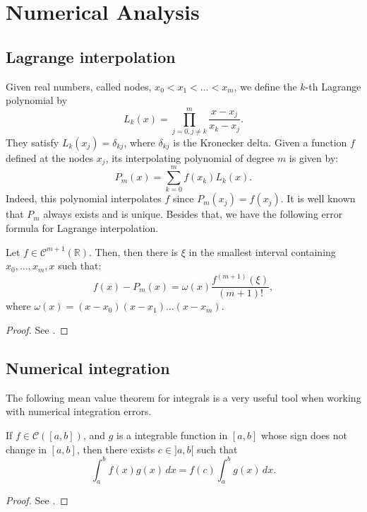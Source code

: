 \chapter{Numerical Analysis}
\label{anexo-na}

\section{Lagrange interpolation}
\label{anexo-interp}
Given real numbers, called nodes, $x_0< x_1 < \ldots< x_m$, we define the $k$-th Lagrange polynomial by
\begin{equation*}
	L_k(x) = \prod_{j=0, j \neq k}^{m}\frac{x-x_j}{x_k-x_j}.
\end{equation*}
They satisfy $L_k(x_j) = \delta_{kj}$, where  $\delta_{kj}$ is the Kronecker delta.
Given a function $f$ defined at the nodes $x_j$, its interpolating polynomial of 
degree $m$ is given by:
\begin{equation*}
	P_m(x) = \sum_{k=0}^{m} f(x_k)L_k(x).
\end{equation*}
Indeed, this polynomial interpolates $f$ since $P_m(x_j) = f(x_j)$.
It is well known that $P_m$ always exists and is unique. Besides that, we have the following error formula
for Lagrange interpolation.
\begin{thrm}
	\label{anexo-interp-error1}
	Let $f \in \mathcal{C}^{m+1}(\mathbb{R})$.
	Then, then there is $\xi$ in the smallest interval containing $x_0, \ldots, x_m, x$ such that:
	\begin{equation}
		f(x)-P_m(x) = \omega(x)\frac{f^{(m+1)}(\xi)}{(m+1)!},
	\end{equation}
	where $\omega(x) = (x-x_0)(x-x_1) \ldots (x-x_m)$.
\end{thrm}
\begin{proof}
	See \citet[Theorem~2.1.4.1. on \pno~49]{stoer:2002}.
\end{proof}

\section{Numerical integration}
\label{anexo-numint}

The following mean value theorem for integrals is a very useful tool 
when working with numerical integration errors.
\begin{thrm}
	\label{anexo-numint-mv}
	If $f \in \mathcal{C}([a,b])$, and $g$ is a integrable function in $[a,b]$
	whose sign does not change in $[a,b]$,
	then there exists $c \in ]a,b[$ such that
	\begin{equation*}
		\int_{a}^{b}f(x)g(x) \,dx = f(c)\int_{a}^{b}g(x) \,dx.
	\end{equation*}
\end{thrm}
\begin{proof}
	See \citet[\pno~143]{courant:1999}.
\end{proof}


